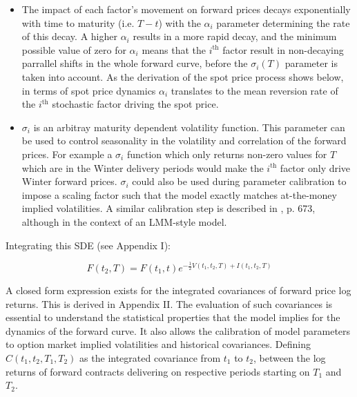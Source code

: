 \documentclass{article}
\begin{document}
\begin{itemize}
    \begin{itemize}
        \item The impact of each factor's movement on forward prices decays exponentially
        with time to maturity (i.e. $T-t$) with the $\alpha_i$ parameter determining the
        rate of this decay. A higher $\alpha_i$ results in a more rapid decay, and the minimum
        possible value of zero for $\alpha_i$ means that the $i^\text{th}$ factor result in 
        non-decaying parrallel shifts in the whole forward curve, before the $\sigma_i(T)$ 
        parameter is taken into account. As the derivation of the spot price process shows
        below, in terms of spot price dynamics $\alpha_i$ translates to the mean reversion 
        rate of the $i^\text{th}$ stochastic factor driving the spot price.
        \item $\sigma_i$ is an arbitray maturity dependent volatility function. This parameter
        can be used to control seasonality in the volatility and correlation of the forward
        prices. For example a $\sigma_i$ function which only returns non-zero values for $T$
        which are in the Winter delivery periods would make the $i^\text{th}$ factor only
        drive Winter forward prices. $\sigma_i$ could also be used during parameter calibration
        to impose a scaling factor such that the model exactly matches at-the-money implied
        volatilities. A similar calibration step is described in \cite{Rebonato}, p. 673, 
        although in the context of an LMM-style model.
    \end{itemize}
\end{itemize}

\bigskip

Integrating this SDE (see Appendix I):

\begin{equation}
    \label{eq:forward_process_integrated}
    F(t_2, T) = F(t_1, t)e^{- \frac{1}{2} V(t_1, t_2, T) + I(t_1, t_2, T)}
\end{equation}

\bigskip

A closed form expression exists for the integrated covariances of
forward price log returns. This is derived in Appendix II. The evaluation of such 
covariances is essential to
understand the statistical properties that the model implies for the dynamics of 
the forward curve. It also allows the calibration of model parameters to option
market implied volatilities and historical covariances. 
Defining $C(t_1, t_2, T_1, T_2)$
as the integrated covariance from $t_1$ to $t_2$, between the log returns of forward 
contracts delivering on respective periods starting on $T_1$ and $T_2$.
\end{document}

